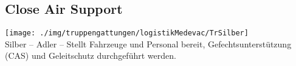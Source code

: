 \subsection{Close Air Support}
\texttt{[image: ./img/truppengattungen/logistikMedevac/TrSilber]}\\
Silber -- Adler -- Stellt Fahrzeuge und Personal bereit,  Gefechtsunterstützung (\ac{CAS}) und Geleitschutz durchgeführt werden.